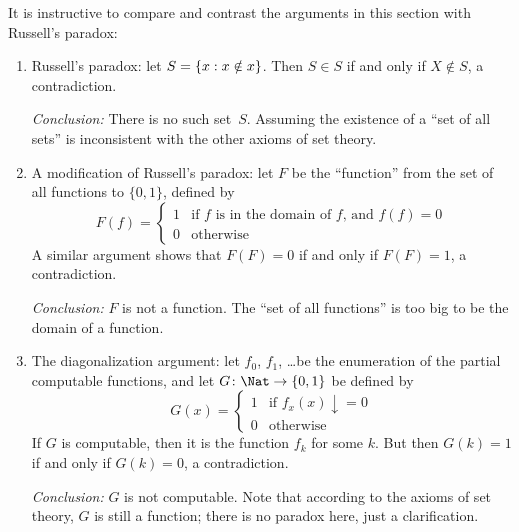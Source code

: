 \documentclass[../../../include/open-logic-section]{subfiles}
\begin{document}

It is instructive to compare and contrast the arguments in
this section with Russell's paradox:
\begin{enumerate}
\item Russell's paradox: let $S = \{ x : x \notin x \}$. Then $S
  \in S$ if and only if $X \notin S$, a contradiction.

  \emph{Conclusion:} There is no such set~$S$. Assuming the existence of a
  ``set of all sets'' is inconsistent with the other axioms of set
  theory.

\item A modification of Russell's paradox: let $F$ be the ``function''
  from the set of all functions to $\{ 0, 1 \}$, defined by
  \[
  F(f) =
  \begin{cases}
    1 & \text{if $f$ is in the domain of $f$, and $f(f) = 0$} \\
    0 & \text{otherwise}
  \end{cases}
  \]
  A similar argument shows that $F(F) = 0$ if and only if $F(F) = 1$,
  a contradiction.

  \emph{Conclusion:} $F$ is not a function. The ``set of all
  functions'' is too big to be the domain of a function.

\item The diagonalization argument: let $f_0$, $f_1$, \dots be the
  enumeration of the partial computable functions, and let $G \colon \Nat \to
  \{ 0, 1 \}$ be defined by
  \[
  G(x) =
  \begin{cases}
    1 & \text{if $f_x(x)\downarrow = 0$} \\
    0 & \text{otherwise}
  \end{cases}
  \]
  If $G$ is computable, then it is the function $f_k$ for some
  $k$. But then $G(k) = 1$ if and only if $G(k) = 0$, a contradiction.

  \emph{Conclusion:} $G$ is not computable. Note that according to the
  axioms of set theory, $G$ is still a function; there is no paradox
  here, just a clarification.
\end{enumerate}
\end{document}

